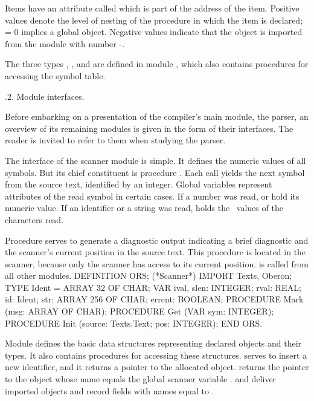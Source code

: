 Items have an attribute called  which is part of the address of the item. Positive values denote the level of nesting of the procedure in which the item is declared;  = 0 implies a global object. Negative values indicate that the object is imported from the module with number -.

The three types , , and  are defined in module , which also contains procedures for accessing the symbol table.

.2. Module interfaces.

Before embarking on a presentation of the compiler's main module, the parser, an overview of its remaining modules is given in the form of their interfaces. The reader is invited to refer to them when studying the parser.

The interface of the scanner module  is simple. It defines the numeric values of all symbols. But its chief constituent is procedure . Each call yields the next symbol from the source text, identified by an integer. Global variables represent attributes of the read symbol in certain cases. If a number was read,  or  hold its numeric value. If an identifier or a string was read,  holds the \ASCII\ values of the characters read.

Procedure  serves to generate a diagnostic output indicating a brief diagnostic and the scanner's current position in the source text. This procedure is located in the scanner, because only the scanner has access to its current position.  is called from all other modules.
\begintt
DEFINITION ORS; (*Scanner*)
  IMPORT Texts, Oberon;
  TYPE Ident = ARRAY 32 OF CHAR;
  VAR ival, slen: INTEGER;
      rval: REAL;
      id: Ident;
      str: ARRAY 256 OF CHAR;
      errcnt: BOOLEAN;
  PROCEDURE Mark (msg: ARRAY OF CHAR);
  PROCEDURE Get (VAR sym: INTEGER);
  PROCEDURE Init (source: Texts.Text; pos: INTEGER);
END ORS.
\endtt

\noindent Module  defines the basic data structures representing declared objects and their types. It also contains procedures for accessing these structures.  serves to insert a new identifier, and it returns a pointer to the allocated object.  returns the pointer to the object whose name equals the global scanner variable .  and  deliver imported objects and record fields with names equal to .

